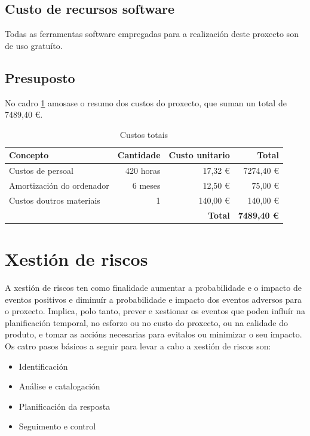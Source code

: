 \subsection{Custo de recursos software}
Todas as ferramentas software empregadas para a realización deste proxecto son de uso gratuíto.

\subsection{Presuposto}
No cadro \ref{tab:presuposto} amosase o resumo dos custos do proxecto, que suman un total de 7489,40 \euro.
\begin{table}[H]
\centering
\begin{tabularx}{\textwidth}{Xrrr} \toprule
	Concepto & Cantidade & Custo unitario & Total \\
	\midrule
	Custos de persoal & 420 horas & 17,32 \euro & 7274,40 \euro \\
	Amortización do ordenador & 6 meses & 12,50 \euro & 75,00 \euro \\
	Custos doutros materiais & 1 & 140,00 \euro & 140,00 \euro \\
	\midrule
	\multicolumn{3}{r}{\textbf{Total}} & \textbf{7489,40 \euro} \\
	\bottomrule
\end{tabularx}
\caption{Custos totais}
\label{tab:presuposto}
\end{table}

\section{Xestión de riscos}
A xestión de riscos ten como finalidade aumentar a probabilidade e o impacto de eventos positivos e diminuír a probabilidade e impacto dos eventos adversos para o proxecto. Implica, polo tanto, prever e xestionar os eventos que poden influír na planificación temporal, no esforzo ou no custo do proxecto, ou na calidade do produto, e tomar as accións necesarias para evitalos ou minimizar o seu impacto. Os catro pasos básicos a seguir para levar a cabo a xestión de riscos son:
\begin{itemize}
\item Identificación
\item Análise e catalogación
\item Planificación da resposta
\item Seguimento e control
\end{itemize}

